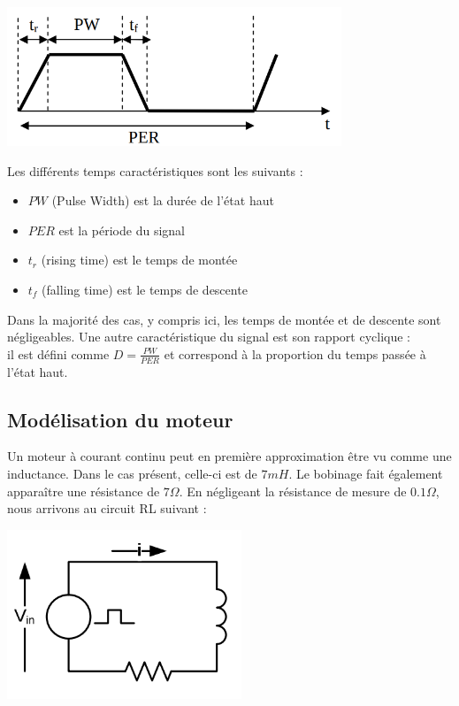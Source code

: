 \documentclass{../template/tp}
\begin{document}
\begin{center}
\includegraphics[width=10cm]{sch2}
\end{center}

Les différents temps caractéristiques sont les suivants :

\begin{itemize}
\item $PW$ (Pulse Width) est la durée de l'état haut
\item $PER$ est la période du signal
\item $t_r$ (rising time) est le temps de montée
\item $t_f$ (falling time) est le temps de descente
\end{itemize}

Dans la majorité des cas, y compris ici, les temps de montée et de descente sont négligeables.
Une autre caractéristique du signal est son rapport cyclique :\\

il est défini comme $D = \frac{PW}{PER}$ et correspond à la proportion du temps passée à l'état haut.

\subsection{Modélisation du moteur}

Un moteur à courant continu peut en première approximation être vu comme une inductance. Dans
le cas présent, celle-ci est de $7mH$. Le bobinage fait également apparaître une résistance de
$7\Omega$.
En négligeant la résistance de mesure de $0.1\Omega$, nous arrivons au circuit RL suivant :

\begin{center}
\includegraphics[width=7cm]{sch3}
\end{center}
\end{document}
